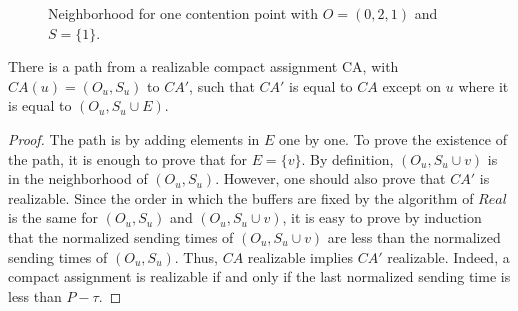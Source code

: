 \begin{figure}
\begin{center}


 \caption{Neighborhood for one contention point with $O = (0,2,1)$ and $S = \{1\}$.}

\label{fig:partialtree}
\end{center}
\end{figure}

\begin{lemma}\label{lemma:path}
There is a path from a realizable compact assignment CA, with $CA(u) = (O_u,S_u)$ to $CA'$, such that 
$CA'$ is equal to $CA$ except on $u$ where it is equal to $(O_u,S_u \cup E)$.  
\end{lemma}
\begin{proof}
The path is by adding elements in $E$ one by one. 
 To prove the existence of the path, it is enough to prove that for  $E = \{v\}$. By definition, $(O_u,S_u \cup{v})$ is in the neighborhood of $(O_u,S_u)$. However, one should also prove that $CA'$ is realizable.
  Since the order in which the buffers are fixed by the algorithm of $Real$ is the same for $(O_u,S_u)$ and $(O_u,S_u \cup{v})$, it is easy to prove by induction that the normalized sending times of $(O_u,S_u \cup{v})$ are less than the normalized sending times of $(O_u,S_u)$. Thus, $CA$ realizable implies $CA'$ realizable. Indeed, 
a compact assignment is realizable if and only if the last normalized sending time is less than $P - \tau$.
\end{proof}



